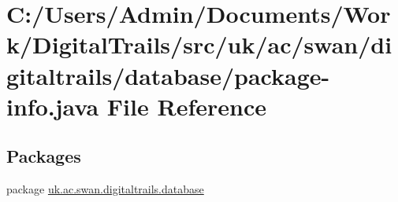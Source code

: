 \hypertarget{database_2package-info_8java}{\section{C\+:/\+Users/\+Admin/\+Documents/\+Work/\+Digital\+Trails/src/uk/ac/swan/digitaltrails/database/package-\/info.java File Reference}
\label{database_2package-info_8java}
}
\subsection*{Packages}
\begin{DoxyCompactItemize}
\item 
package \hyperlink{namespaceuk_1_1ac_1_1swan_1_1digitaltrails_1_1database}{uk.\+ac.\+swan.\+digitaltrails.\+database}
\end{DoxyCompactItemize}
